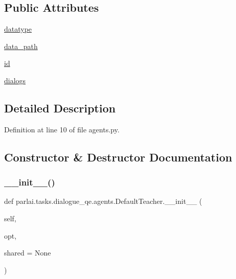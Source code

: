 \subsection*{Public Attributes}
\begin{DoxyCompactItemize}
\item 
\hyperlink{classparlai_1_1tasks_1_1dialogue__qe_1_1agents_1_1DefaultTeacher_a8eace6f1c9861d2e153398f1e65ddcd9}{datatype}
\item 
\hyperlink{classparlai_1_1tasks_1_1dialogue__qe_1_1agents_1_1DefaultTeacher_a18ebf9bfac4f5585c7413bd566030a0c}{data\+\_\+path}
\item 
\hyperlink{classparlai_1_1tasks_1_1dialogue__qe_1_1agents_1_1DefaultTeacher_a8f8ccd686c7a9b8e92a0de772b13a55b}{id}
\item 
\hyperlink{classparlai_1_1tasks_1_1dialogue__qe_1_1agents_1_1DefaultTeacher_a313b63d94f39392184547a7bc202ad7d}{dialogs}
\end{DoxyCompactItemize}


\subsection{Detailed Description}


Definition at line 10 of file agents.\+py.



\subsection{Constructor \& Destructor Documentation}
\mbox{\label{classparlai_1_1tasks_1_1dialogue__qe_1_1agents_1_1DefaultTeacher_a0c1e9213010eca7835baa3507a241c09}} 
\subsubsection{\texorpdfstring{\+\_\+\+\_\+init\+\_\+\+\_\+()}{\_\_init\_\_()}}
{\footnotesize\ttfamily def parlai.\+tasks.\+dialogue\+\_\+qe.\+agents.\+Default\+Teacher.\+\_\+\+\_\+init\+\_\+\+\_\+ (\begin{DoxyParamCaption}\item[{}]{self,  }\item[{}]{opt,  }\item[{}]{shared = {\ttfamily None} }\end{DoxyParamCaption})}



